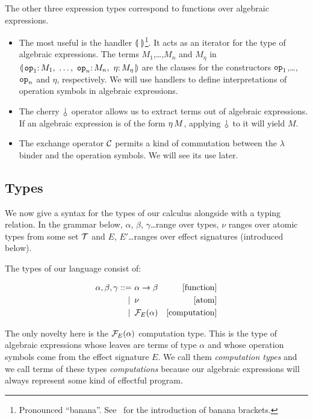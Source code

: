 \documentclass{llncs}
\begin{document}
The other three expression types correspond to functions over algebraic
expressions.
\begin{itemize}
\item The most useful is the handler $\llparenthesis \,  \, \rrparenthesis$\footnote{Pronounced
  ``banana''. See~\cite{meijer1991functional} for the introduction of
  banana brackets.}. It acts as an iterator for the type of algebraic
  expressions. The terms $M_1$,\ldots,$M_n$ and $M_\eta$ in $\cdbanana$ are
  the clauses for the constructors $\mathtt{op}_1$,\ldots,$\mathtt{op}_n$ and
  $\eta$, respectively. We will use handlers to define interpretations of
  operation symbols in algebraic expressions.
\item The cherry $\cherry$ operator allows us to extract terms out of
  algebraic expressions. If an algebraic expression is of the form
  $\eta\,M$, applying $\cherry$ to it will yield $M$.
\item The exchange operator $\mathcal{C}$ permits a kind of commutation between the
  $\lambda$ binder and the operation symbols. We will see its use later.
\end{itemize}


\subsection{Types}
\label{ssec:types}

We now give a syntax for the types of our calculus alongside with a typing
relation. In the grammar below, $\alpha$, $\beta$, $\gamma$\ldots range
over types, $\nu$ ranges over atomic types from some set $\mathcal{T}$ and $E$,
$E'$\ldots ranges over effect signatures (introduced below).

The types of our language consist of:

\begin{align*}
  \alpha, \beta, \gamma ::= &\ \alpha \to \beta & \mbox{[function]} \\
   | \, &\ \nu & \mbox{[atom]} \\
   | \, &\ \mathcal{F}_E(\alpha) & \mbox{[computation]}
\end{align*}

The only novelty here is the $\mathcal{F}_E(\alpha)$ computation type. This is the
type of algebraic expressions whose leaves are terms of type $\alpha$ and
whose operation symbols come from the effect signature $E$. We call them
\emph{computation types} and we call terms of these types
\emph{computations} because our algebraic expressions will always represent
some kind of effectful program.
\end{document}
